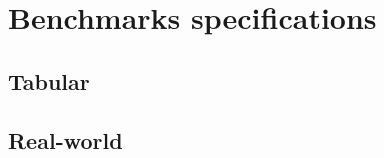 \chapter{Benchmarks specifications}
\label{ch:specs_appendix}

\section{Tabular}

% 






\section{Real-world}















